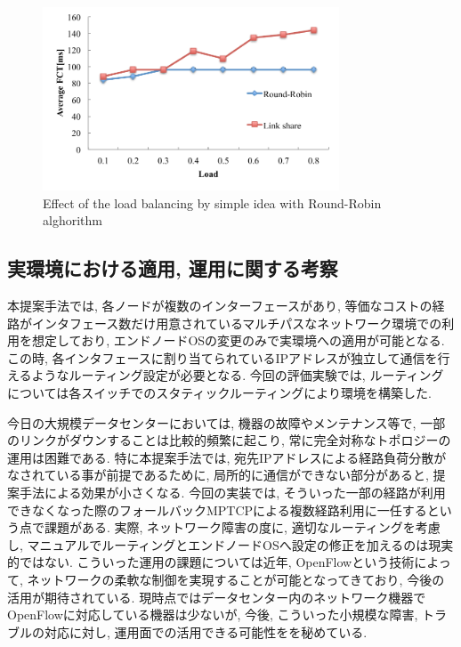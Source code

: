 \begin{figure}[t]
    \begin{center}
    \includegraphics[autoebb, width=250pt]{./img/robin.pdf}
    \caption{Effect of the load balancing by simple idea with Round-Robin
    alghorithm}
    \label{fig:robin}
    \end{center}
\end{figure}

\subsection{実環境における適用, 運用に関する考察}
本提案手法では, 各ノードが複数のインターフェースがあり,
等価なコストの経路がインタフェース数だけ用意されているマルチパスなネットワーク環境での利用を想定しており,
エンドノードOSの変更のみで実環境への適用が可能となる.
この時, 各インタフェースに割り当てられているIPアドレスが独立して通信を行えるようなルーティング設定が必要となる. 
今回の評価実験では, ルーティングについては各スイッチでのスタティックルーティングにより環境を構築した. 

今日の大規模データセンターにおいては, 機器の故障やメンテナンス等で, 一部のリンクがダウンすることは比較的頻繁に起こり\cite{trouble},
常に完全対称なトポロジーの運用は困難である.
特に本提案手法では, 宛先IPアドレスによる経路負荷分散がなされている事が前提であるために, 局所的に通信ができない部分があると,
提案手法による効果が小さくなる.
今回の実装では, そういった一部の経路が利用できなくなった際のフォールバックMPTCPによる複数経路利用に一任するという点で課題がある. 
実際, ネットワーク障害の度に, 適切なルーティングを考慮し, マニュアルでルーティングとエンドノードOSへ設定の修正を加えるのは現実的ではない. 
こういった運用の課題については近年,  OpenFlowという技術によって,
ネットワークの柔軟な制御を実現することが可能となってきており, 今後の活用が期待されている\cite{openflow}.
現時点ではデータセンター内のネットワーク機器でOpenFlowに対応している機器は少ないが, 今後, こういった小規模な障害, トラブルの対応に対し,
運用面での活用できる可能性をを秘めている. 

 
